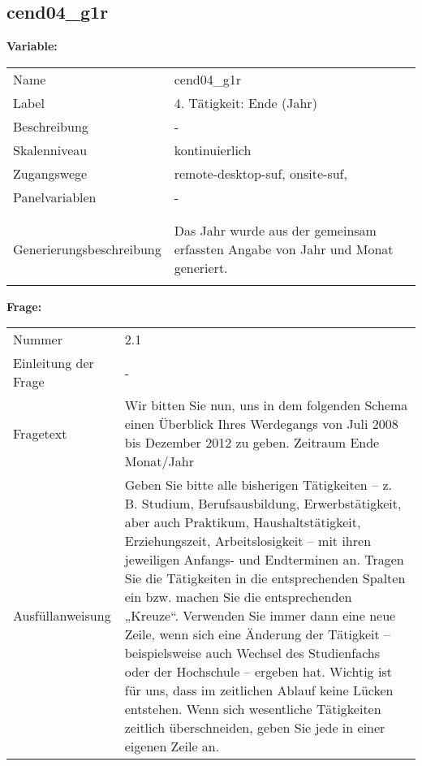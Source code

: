 	
	
	\subsection{cend04\_g1r}
	\label{subSection:cend04_g1r}

	\noindent\textbf{Variable:}\\
		\begin{tabular}{lL{11.3cm}}
			\label{tableVariable:cend04_g1r}
			Name & cend04\_g1r \\
			Label & 4. Tätigkeit: Ende (Jahr)  \\
			Beschreibung & - \\
			Skalenniveau & kontinuierlich \\
			Zugangswege &
				remote-desktop-suf,
				onsite-suf,
 \\
			Panelvariablen & -
			 \\
			 \\
 \\
					Generierungsbeschreibung & Das Jahr wurde aus der gemeinsam erfassten Angabe von Jahr und Monat generiert. 
				 \\	
			 \\
		\end{tabular}

		\vspace*{1 cm}
		\noindent\textbf{Frage:}\\
		\begin{tabular}{lL{11.3cm}}
			\label{tableQuestion:cend04_g1r}
			Nummer & 2.1 \\
			Einleitung der Frage & - \\
			Fragetext & Wir bitten Sie nun, uns in dem folgenden Schema einen Überblick Ihres Werdegangs von Juli 2008 bis Dezember 2012 zu geben.
Zeitraum
Ende
Monat/Jahr \\
			Ausfüllanweisung & Geben Sie bitte alle bisherigen Tätigkeiten – z. B. Studium, Berufsausbildung, Erwerbstätigkeit, aber auch Praktikum, Haushaltstätigkeit,
Erziehungszeit, Arbeitslosigkeit – mit ihren jeweiligen Anfangs- und Endterminen an. Tragen Sie die Tätigkeiten in die entsprechenden Spalten ein bzw. machen Sie die entsprechenden „Kreuze“. Verwenden Sie immer dann eine neue Zeile, wenn sich eine Änderung der Tätigkeit – beispielsweise auch Wechsel des Studienfachs oder der Hochschule – ergeben hat. Wichtig ist für uns, dass im zeitlichen Ablauf keine Lücken entstehen. Wenn sich wesentliche Tätigkeiten zeitlich überschneiden, geben Sie jede in einer eigenen Zeile an. \\
		\end{tabular}




